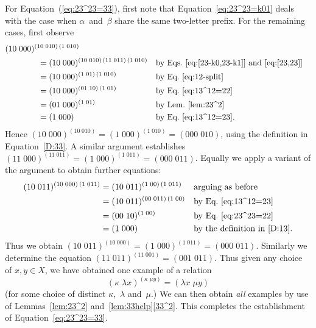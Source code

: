 \documentclass[a4paper,11pt]{article}
\numberwithin{equation}{section}
\newcommand{\eqstate}[1]{Equation~(\ref{#1})}
\newcommand{\swap}[2]{(#1\;#2)}
\begin{document}
For \eqstate{eq:23^23=33}, first note that
Equation~\eqref{eq:23^23=k01} deals with the case when
$\alpha$~and~$\beta$ share the same two-letter prefix.  For the
remaining cases, first observe
\begin{align*}
  \lefteqn{\swap{10}{000}^{\swap{10}{010} \, \swap{1}{010}}}\hspace*{4em} & \\*
  &= \swap{10}{000}^{\swap{10}{010} \, \swap{11}{011} \,
    \swap{1}{010}}
  &&\text{by Eqs.~\eqref{eq:[23-k0,23-k1]} and \eqref{eq:[23,23]}} \\
  &= \swap{10}{000}^{\swap{1}{01} \, \swap{1}{010}}
  &&\text{by Eq.~\eqref{eq:12-split}} \\
  &= \swap{10}{000}^{\swap{01}{10} \, \swap{1}{01}}
  &&\text{by Eq.~\eqref{eq:13^12=22}} \\
  &= \swap{01}{000}^{\swap{1}{01}}
  &&\text{by Lem.~\ref{lem:23^2}} \\
  &= \swap{1}{000}
  &&\text{by Eq.~\eqref{eq:13^12=23}.}
\end{align*}
Hence $\swap{10}{000}^{\swap{10}{010}} = \swap{1}{000}^{\swap{1}{010}}
= \swap{000}{010}$, using the definition in Equation~\eqref{D:33}.  A
similar argument establishes $\swap{11}{000}^{\swap{11}{011}} =
\swap{1}{000}^{\swap{1}{011}} = \swap{000}{011}$.  Equally we apply a
variant of the argument to obtain further equations:
\begin{align*}
  \swap{10}{011}^{\swap{10}{000} \, \swap{1}{011}}
  &= \swap{10}{011}^{\swap{1}{00} \, \swap{1}{011}}
  &&\text{arguing as before} \\
  &= \swap{10}{011}^{\swap{00}{011} \, \swap{1}{00}}
  &&\text{by Eq.~\eqref{eq:13^12=23}} \\
  &= \swap{00}{10}^{\swap{1}{00}}
  &&\text{by Eq.~\eqref{eq:23^23=22}} \\
  &= \swap{1}{000}
  &&\text{by the definition in~\eqref{D:13}.}
\end{align*}
Thus we obtain $\swap{10}{011}^{\swap{10}{000}} =
\swap{1}{000}^{\swap{1}{011}} = \swap{000}{011}$.  Similarly we
determine the equation $\swap{11}{011}^{\swap{11}{001}} =
\swap{001}{011}$.  Thus given any choice of $x,y \in X$, we have
obtained one example of a relation
\[
\swap{\kappa}{\lambda x}^{\swap{\kappa}{\mu y}} = \swap{\lambda x}{\mu y}
\]
(for some choice of distinct $\kappa$,~$\lambda$ and~$\mu$.)  We can
then obtain \emph{all} examples by use of Lemmas~\ref{lem:23^2}
and~\ref{lem:33help}\ref{33^2}.  This completes the establishment of
Equation~\eqref{eq:23^23=33}.
\end{document}

